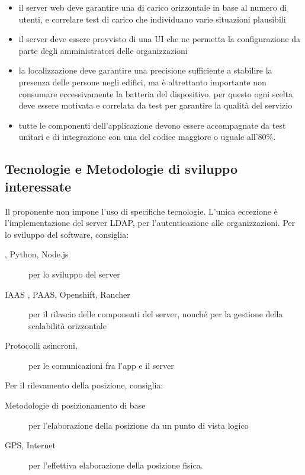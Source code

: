 \documentclass[../studio-di-fattibilita.tex]{subfiles}
\begin{document}
\begin{itemize}
    \item il server web deve garantire una  di carico orizzontale in base al numero di utenti, e correlare test di carico che individuano varie situazioni plausibili
    \item il server deve essere provvisto di una UI che ne permetta la configurazione da parte degli amministratori delle organizzazioni
    \item la localizzazione deve garantire una precisione sufficiente a stabilire la presenza delle persone negli edifici, ma è altrettanto importante non consumare eccessivamente la batteria del dispositivo, per questo ogni scelta deve essere motivata e correlata da test per garantire la qualità del servizio
    \item tutte le componenti dell'applicazione devono essere accompagnate da test unitari e di integrazione con una  del codice maggiore o uguale all'80\%.
  \end{itemize}


  \subsection{Tecnologie e Metodologie di sviluppo interessate}%
  \label{subsec:tecnologie_interessate}
  Il proponente non impone l'uso di specifiche tecnologie. L'unica eccezione è l'implementazione del server LDAP, per l'autenticazione alle organizzazioni.
  Per lo sviluppo del software, consiglia:
  \begin{description}
    \item[, Python, Node.js] per lo sviluppo del server
    \item[IAAS , PAAS, Openshift, Rancher] per il rilascio delle componenti del server, nonché per la gestione della scalabilità orizzontale
    \item[Protocolli asincroni, ] per le comunicazioni fra l'app e il server
  \end{description}

  Per il rilevamento della posizione, consiglia:
  \begin{description}
    \item[Metodologie di posizionamento di base] per l'elaborazione della posizione da un punto di vista logico
    \item[GPS, Internet] per l'effettiva elaborazione della posizione fisica.
  \end{description}
\end{document}
